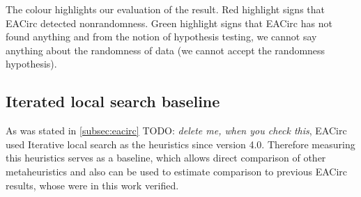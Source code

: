 \documentclass[
  print, %
  Table,   %
  nolof,     %
  nolot,     %
  11pt, %
  oneside  %
]{fithesis3}
\newcommand{\todo}[1]{TODO: \textit{#1}}
\begin{document}
The colour highlights our evaluation of the result. Red highlight signs that EACirc detected nonrandomness. Green highlight signs that EACirc has not found anything and from the notion of hypothesis testing, we cannot say anything about the randomness of data (we cannot accept the randomness hypothesis).

\subsection{Iterated local search baseline}
\label{subsec:res-ss-ils}

As was stated in \cref{subsec:eacirc} \todo{delete me, when you check this}, EACirc used Iterative local search as the heuristics since version 4.0. Therefore measuring this heuristics serves as a baseline, which allows direct comparison of other metaheuristics and also can be used to estimate comparison to previous EACirc results, whose were in this work verified.
\end{document}
